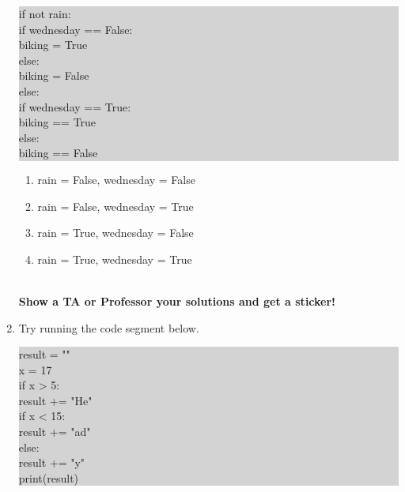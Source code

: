 \documentclass[11pt, letterpaper, onecolumn, oneside, final]{article}
\begin{document}
\begin{enumerate}
\colorbox{lightgray}{\parbox{.88\textwidth}{\consolas if not rain: \\
\hspace*{6mm}if wednesday == False: \\ \hspace*{12mm}biking = True \\ \hspace*{6mm}else:\\ \hspace*{12mm}biking = False \\else: \\ \hspace*{6mm}if wednesday == True:\\ \hspace*{12mm}biking == True \\ \hspace*{6mm}else: \\
\hspace*{12mm}biking == False}}

\begin{enumerate}
    \item {\consolas rain = False}, {\consolas wednesday = False}\\
    \item {\consolas rain = False}, {\consolas wednesday = True}\\
    \item {\consolas rain = True}, {\consolas wednesday = False}\\
    \item {\consolas rain = True}, {\consolas wednesday = True}\\
\end{enumerate}
\\
\textbf{Show a TA or Professor your solutions and get a sticker!}
\item Try running the code segment below.

\colorbox{lightgray}{\parbox{.88\textwidth}{\consolas result = "" \\ x = 17 \\ 
if x > 5: \\ \hspace*{6mm} result += "He" \\ \hspace*{6mm}if x < 15: \\ 
\hspace*{12mm}result += "ad" \\else: \\ \hspace*{6mm}result += "y" \\ 
print(result)}}


\end{enumerate}
\end{document}
